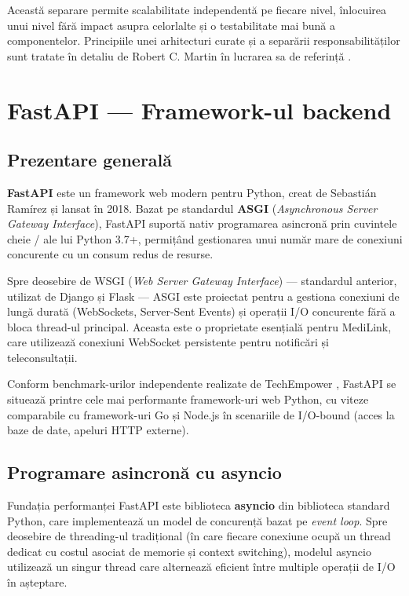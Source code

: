 Această separare permite scalabilitate independentă pe fiecare nivel, înlocuirea unui nivel fără impact asupra celorlalte și o testabilitate mai bună a componentelor. Principiile unei arhitecturi curate și a separării responsabilităților sunt tratate în detaliu de Robert C. Martin în lucrarea sa de referință \cite{martin2017clean}.

\section{FastAPI --- Framework-ul backend}

\subsection{Prezentare generală}

\textbf{FastAPI} \cite{fastapi2024} este un framework web modern pentru Python, creat de Sebastián Ramírez și lansat în 2018. Bazat pe standardul \textbf{ASGI} (\textit{Asynchronous Server Gateway Interface}), FastAPI suportă nativ programarea asincronă prin cuvintele cheie / ale lui Python 3.7+, permițând gestionarea unui număr mare de conexiuni concurente cu un consum redus de resurse.

Spre deosebire de WSGI (\textit{Web Server Gateway Interface}) --- standardul anterior, utilizat de Django și Flask --- ASGI este proiectat pentru a gestiona conexiuni de lungă durată (WebSockets, Server-Sent Events) și operații I/O concurente fără a bloca thread-ul principal. Aceasta este o proprietate esențială pentru MediLink, care utilizează conexiuni WebSocket persistente pentru notificări și teleconsultații.

Conform benchmark-urilor independente realizate de TechEmpower \cite{techempower2024}, FastAPI se situează printre cele mai performante framework-uri web Python, cu viteze comparabile cu framework-uri Go și Node.js în scenariile de I/O-bound (acces la baze de date, apeluri HTTP externe).

\subsection{Programare asincronă cu asyncio}

Fundația performanței FastAPI este biblioteca \textbf{asyncio} \cite{python_asyncio2024} din biblioteca standard Python, care implementează un model de concurență bazat pe \textit{event loop}. Spre deosebire de threading-ul tradițional (în care fiecare conexiune ocupă un thread dedicat cu costul asociat de memorie și context switching), modelul asyncio utilizează un singur thread care alternează eficient între multiple operații de I/O în așteptare.

